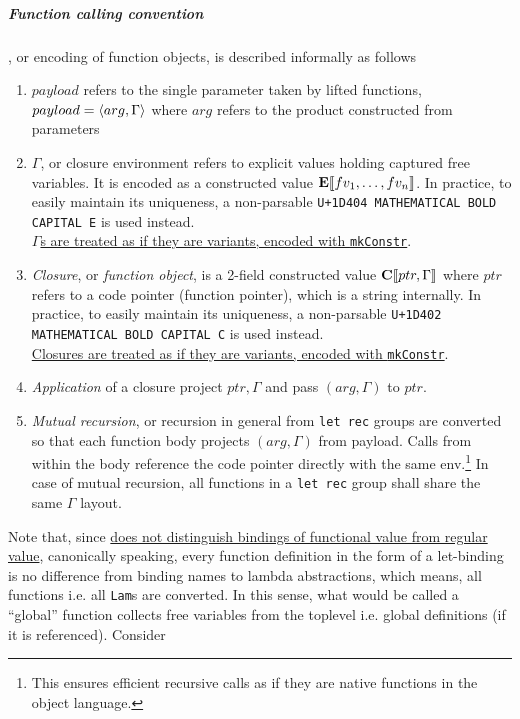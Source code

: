 \documentclass[a4paper, 11pt]{article}
\theoremstyle{remark}\newtheorem*{remark}{Remark}
\theoremstyle{definition}\newtheorem*{definition}{Definition}
\begin{document}
\subparagraph{Function calling convention}, or encoding of function objects, is described informally as follows
\begin{enumerate}
\item $payload$ refers to the single parameter taken by lifted functions,
  $payload=\langle arg, \Gamma \rangle$ where $arg$ refers
  to the product constructed from parameters
\item $\Gamma$, or closure environment refers to explicit values holding captured free variables.
  It is encoded
  as a constructed value $\mathbf{E}\llbracket fv_1,\dots,fv_n \rrbracket$. In practice, to easily
  maintain its uniqueness, a non-parsable \texttt{U+1D404 MATHEMATICAL BOLD CAPITAL E} is used instead.
  \\
  \underline{$\Gamma$s are treated as if they are variants, encoded with \texttt{mkConstr}}.
\item \emph{Closure}, or \emph{function object},
  is a 2-field constructed value $\mathbf{C}\llbracket ptr, \Gamma \rrbracket$
  where $ptr$ refers to a code pointer (function pointer), which is a string internally.
  In practice, to easily maintain its uniqueness, a non-parsable \texttt{U+1D402 MATHEMATICAL BOLD CAPITAL C} is used instead.
  \\
  \underline{Closures are treated as if they are variants, encoded with \texttt{mkConstr}}.
\item \emph{Application} of a closure project $ptr,\Gamma$ and pass $(arg, \Gamma)$ to $ptr$.
\item \emph{Mutual recursion}, or recursion in general from \texttt{let rec} groups are converted so that
  each function body projects $(arg, \Gamma)$ from payload. Calls from within the body reference
  the code pointer directly with the same env.\footnote{
  This ensures efficient recursive calls as if they are native functions in the object language.}
  In case of mutual recursion, all functions in a \texttt{let rec}
  group shall share the same $\Gamma$ layout.
\end{enumerate}

Note that, since \underline{\Tigris does not distinguish bindings of functional value from regular
value}, canonically speaking, every function definition in the form of a let-binding is no difference
from binding names to lambda abstractions, which means,
all functions i.e. all \texttt{Lam}s are converted. In this sense, what would be called a
``global'' function collects free variables from the toplevel
i.e. global definitions (if it is referenced). Consider
\end{document}
